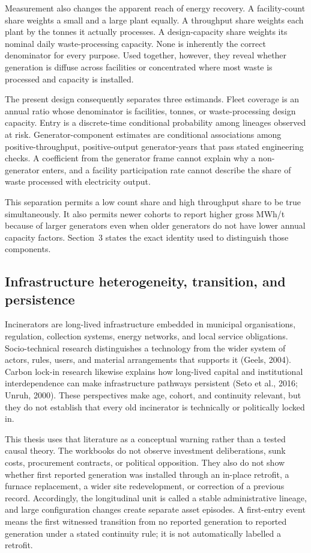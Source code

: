 \documentclass[12pt,a4paper]{article}
\begin{document}
Measurement also changes the apparent reach of energy recovery. A facility-count
share weights a small and a large plant equally. A throughput share weights each
plant by the tonnes it actually processes. A design-capacity share weights its
nominal daily waste-processing capacity. None is inherently the correct
denominator for every purpose. Used together, however, they reveal whether
generation is diffuse across facilities or concentrated where most waste is
processed and capacity is installed.

The present design consequently separates three estimands. Fleet coverage is an
annual ratio whose denominator is facilities, tonnes, or waste-processing design
capacity. Entry is a discrete-time conditional probability among lineages
observed at risk. Generator-component estimates are conditional associations
among positive-throughput, positive-output generator-years that pass stated
engineering checks. A coefficient from the generator frame cannot explain why a
non-generator enters, and a facility participation rate cannot describe the
share of waste processed with electricity output.

This separation permits a low count share and high throughput share to be true
simultaneously. It also permits newer cohorts to report higher gross MWh/t
because of larger generators even when older generators do not have lower annual
capacity factors. Section~3 states the exact identity used to distinguish those
components.

\subsection{Infrastructure heterogeneity, transition, and persistence}

Incinerators are long-lived infrastructure embedded in municipal organisations,
regulation, collection systems, energy networks, and local service obligations.
Socio-technical research distinguishes a technology from the wider system of
actors, rules, users, and material arrangements that supports it (Geels, 2004).
Carbon lock-in research likewise explains how long-lived capital and
institutional interdependence can make infrastructure pathways persistent
(Seto et al., 2016; Unruh, 2000). These perspectives make age, cohort, and
continuity relevant, but they do not establish that every old incinerator is
technically or politically locked in.

This thesis uses that literature as a conceptual warning rather than a tested
causal theory. The workbooks do not observe investment deliberations, sunk
costs, procurement contracts, or political opposition. They also do not show
whether first reported generation was installed through an in-place retrofit, a
furnace replacement, a wider site redevelopment, or correction of a previous
record. Accordingly, the longitudinal unit is called a stable administrative
lineage, and large configuration changes create separate asset episodes. A
first-entry event means the first witnessed transition from no reported
generation to reported generation under a stated continuity rule; it is not
automatically labelled a retrofit.
\end{document}
